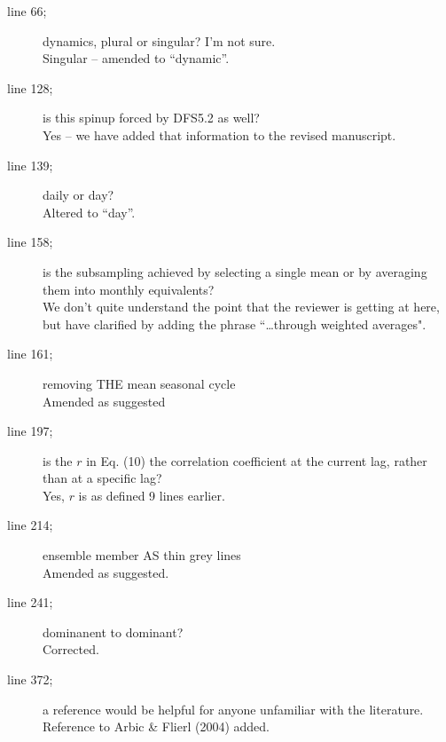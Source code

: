\documentclass[11pt]{article}
\begin{document}
{\color{blue} 
\begin{description}
\item[line 66;] dynamics, plural or singular? I'm not sure.\\
{\color{black} Singular -- amended to ``dynamic''. }

\item[line 128;] is this spinup forced by DFS5.2 as well?\\
{\color{black} Yes -- we have added that information to the revised manuscript. }

\item[line 139;] daily or day?\\
{\color{black} Altered to ``day''.}

\item[line 158;] is the subsampling achieved by selecting a single mean or by averaging them into monthly equivalents?\\
{\color{black} We don't quite understand the point that the reviewer is getting at here, but have clarified by adding the phrase ``\ldots  through weighted averages". }

\item[line 161;] removing THE mean seasonal cycle\\
{\color{black} Amended as suggested }

\item[line 197;] is the $r$ in Eq. (10) the correlation coefficient at the current lag, rather than at a specific lag?\\
{\color{black} Yes, $r$ is as defined 9 lines earlier. }

\item[line 214;] ensemble member AS thin grey lines\\
{\color{black} Amended as suggested. }

\item[line 241;] dominanent to dominant?\\
{\color{black} Corrected. }

\item[line 372;] a reference would be helpful for anyone unfamiliar with the literature.\\
{\color{black} Reference to Arbic \& Flierl (2004) added. }

\end{description}
}
\end{document}
